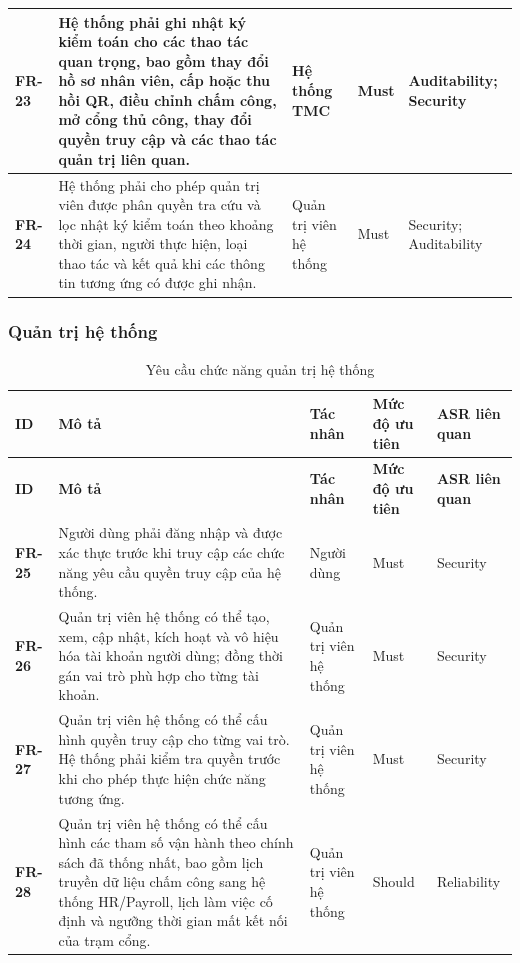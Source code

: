 \begin{longtable}{|>{\centering\arraybackslash}m{1.3cm}|>{\raggedright\arraybackslash}m{6.2cm}|>{\raggedright\arraybackslash}m{2.4cm}|>{\centering\arraybackslash}m{1.5cm}|>{\raggedright\arraybackslash}m{3.5cm}|}
    \hline
    \textbf{FR-23} & Hệ thống phải ghi nhật ký kiểm toán cho các thao tác quan trọng, bao gồm thay đổi hồ sơ nhân viên, cấp hoặc thu hồi QR, điều chỉnh chấm công, mở cổng thủ công, thay đổi quyền truy cập và các thao tác quản trị liên quan. & Hệ thống TMC & Must & Auditability; Security\\
    \hline
    \textbf{FR-24} & Hệ thống phải cho phép quản trị viên được phân quyền tra cứu và lọc nhật ký kiểm toán theo khoảng thời gian, người thực hiện, loại thao tác và kết quả khi các thông tin tương ứng có được ghi nhận. & Quản trị viên hệ thống & Must & Security; Auditability\\
    \hline
\end{longtable}
\endgroup

\subsubsection{Quản trị hệ thống}

\begingroup
\small
\renewcommand{\arraystretch}{1.2}
\begin{longtable}{|>{\centering\arraybackslash}m{1.3cm}|>{\raggedright\arraybackslash}m{6.2cm}|>{\raggedright\arraybackslash}m{2.4cm}|>{\centering\arraybackslash}m{1.5cm}|>{\raggedright\arraybackslash}m{3.5cm}|}
    \caption{Yêu cầu chức năng quản trị hệ thống}\label{tab:functional-requirements-administration}\\
    \hline
    \textbf{ID} & \textbf{Mô tả} & \textbf{Tác nhân} & \textbf{Mức độ ưu tiên} & \textbf{ASR liên quan}\\
    \hline
    \endfirsthead
    \hline
    \textbf{ID} & \textbf{Mô tả} & \textbf{Tác nhân} & \textbf{Mức độ ưu tiên} & \textbf{ASR liên quan}\\
    \hline
    \endhead
    \hline
    \endfoot
    \hline
    \endlastfoot
    \textbf{FR-25} & Người dùng phải đăng nhập và được xác thực trước khi truy cập các chức năng yêu cầu quyền truy cập của hệ thống. & Người dùng & Must & Security\\
    \hline
    \textbf{FR-26} & Quản trị viên hệ thống có thể tạo, xem, cập nhật, kích hoạt và vô hiệu hóa tài khoản người dùng; đồng thời gán vai trò phù hợp cho từng tài khoản. & Quản trị viên hệ thống & Must & Security\\
    \hline
    \textbf{FR-27} & Quản trị viên hệ thống có thể cấu hình quyền truy cập cho từng vai trò. Hệ thống phải kiểm tra quyền trước khi cho phép thực hiện chức năng tương ứng. & Quản trị viên hệ thống & Must & Security\\
    \hline
    \textbf{FR-28} & Quản trị viên hệ thống có thể cấu hình các tham số vận hành theo chính sách đã thống nhất, bao gồm lịch truyền dữ liệu chấm công sang hệ thống HR/Payroll, lịch làm việc cố định và ngưỡng thời gian mất kết nối của trạm cổng. & Quản trị viên hệ thống & Should & Reliability\\
    \hline
\end{longtable}
\endgroup


